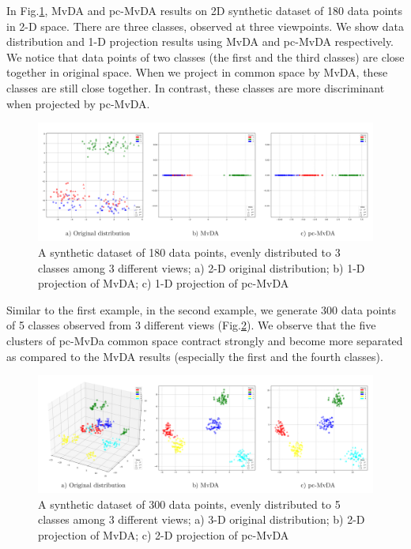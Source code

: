         In Fig.\ref{fig:synthetic1}, MvDA and pc-MvDA results on 2D synthetic dataset of 180 data points in 2-D space. There are three classes, observed at three viewpoints. We show data distribution and 1-D projection results using MvDA and pc-MvDA respectively. We notice that data points of two classes (the first and the third classes) are close together in original space. When we project in common space by MvDA, these classes are still close together. In contrast, these classes are more discriminant when projected by pc-MvDA.

        \begin{figure}[htbp]
            \centering
            \includegraphics[width=1\linewidth]{Figs/Synthetic1.png}
            \caption{A synthetic dataset of 180 data points, evenly distributed to 3 classes among 3 different views; a) 2-D original distribution; b) 1-D projection of MvDA; c) 1-D projection of pc-MvDA}
            \label{fig:synthetic1}
        \end{figure}

        Similar to the first example, in the second example, we generate 300 data points of 5 classes observed from 3 different views (Fig.\ref{fig:synthetic2}). We observe that the five clusters of pc-MvDa common space contract strongly and become more separated as compared to the MvDA results (especially the first and the fourth classes).

        \begin{figure}[htbp]
            \centering
            \includegraphics[width=1\linewidth]{Figs/Synthetic2.png}
            \caption{A synthetic dataset of 300 data points, evenly distributed to 5 classes among 3 different views; a) 3-D original distribution; b) 2-D projection of MvDA; c) 2-D projection of pc-MvDA}
            \label{fig:synthetic2}
        \end{figure}

